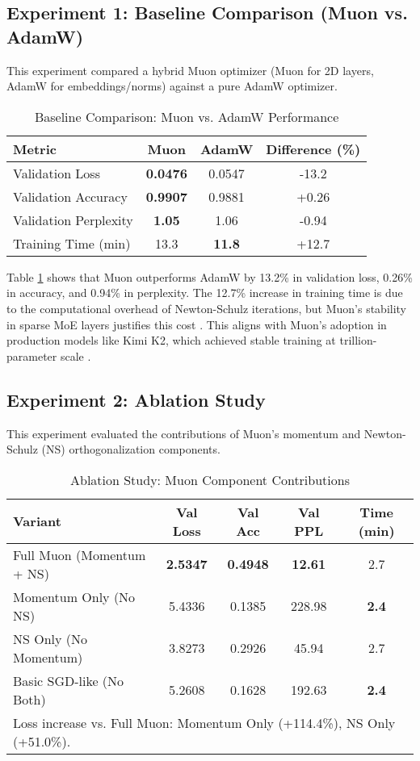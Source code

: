 \documentclass[11pt, a4paper]{article}
\begin{document}
\subsection{Experiment 1: Baseline Comparison (Muon vs. AdamW)}
This experiment compared a hybrid Muon optimizer (Muon for 2D layers, AdamW for embeddings/norms) against a pure AdamW optimizer.

\begin{table}[h]
\centering
\caption{Baseline Comparison: Muon vs. AdamW Performance}
\label{tab:exp1}
\begin{tabular}{@{}lccc@{}}
\toprule
Metric & Muon & AdamW & Difference (\%) \\ \midrule
Validation Loss & \textbf{0.0476} & 0.0547 & -13.2 \\
Validation Accuracy & \textbf{0.9907} & 0.9881 & +0.26 \\
Validation Perplexity & \textbf{1.05} & 1.06 & -0.94 \\
Training Time (min) & 13.3 & \textbf{11.8} & +12.7 \\ \bottomrule
\end{tabular}
\end{table}

Table \ref{tab:exp1} shows that Muon outperforms AdamW by 13.2\% in validation loss, 0.26\% in accuracy, and 0.94\% in perplexity. The 12.7\% increase in training time is due to the computational overhead of Newton-Schulz iterations, but Muon’s stability in sparse MoE layers justifies this cost \cite{liu2025muon}. This aligns with Muon’s adoption in production models like Kimi K2, which achieved stable training at trillion-parameter scale \cite{moonshot2025kimi}.

\subsection{Experiment 2: Ablation Study}
This experiment evaluated the contributions of Muon’s momentum and Newton-Schulz (NS) orthogonalization components.

\begin{table}[h]
\centering
\caption{Ablation Study: Muon Component Contributions}
\label{tab:exp2}
\begin{tabular}{@{}lcccc@{}}
\toprule
Variant & Val Loss & Val Acc & Val PPL & Time (min) \\ \midrule
Full Muon (Momentum + NS) & \textbf{2.5347} & \textbf{0.4948} & \textbf{12.61} & 2.7 \\
Momentum Only (No NS) & 5.4336 & 0.1385 & 228.98 & \textbf{2.4} \\
NS Only (No Momentum) & 3.8273 & 0.2926 & 45.94 & 2.7 \\
Basic SGD-like (No Both) & 5.2608 & 0.1628 & 192.63 & \textbf{2.4} \\ \bottomrule
\multicolumn{5}{l}{\small Loss increase vs. Full Muon: Momentum Only (+114.4\%), NS Only (+51.0\%).}
\end{tabular}
\end{table}
\end{document}
